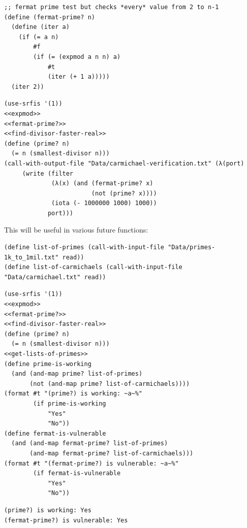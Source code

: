 \documentclass[final,fleqn,titlepage]{article}
\begin{document}
\begin{verbatim}
;; fermat prime test but checks *every* value from 2 to n-1
(define (fermat-prime? n)
  (define (iter a)
    (if (= a n)
        #f
        (if (= (expmod a n n) a)
            #t
            (iter (+ 1 a)))))
  (iter 2))
\end{verbatim}

\begin{verbatim}
(use-srfis '(1))
<<expmod>>
<<fermat-prime?>>
<<find-divisor-faster-real>>
(define (prime? n)
  (= n (smallest-divisor n)))
(call-with-output-file "Data/carmichael-verification.txt" (λ(port)
     (write (filter
             (λ(x) (and (fermat-prime? x)
                        (not (prime? x))))
             (iota (- 1000000 1000) 1000))
            port)))
\end{verbatim}

This will be useful in various future functions:
\begin{verbatim}
(define list-of-primes (call-with-input-file "Data/primes-1k_to_1mil.txt" read))
(define list-of-carmichaels (call-with-input-file "Data/carmichael.txt" read))
\end{verbatim}

\begin{verbatim}
(use-srfis '(1))
<<expmod>>
<<fermat-prime?>>
<<find-divisor-faster-real>>
(define (prime? n)
  (= n (smallest-divisor n)))
<<get-lists-of-primes>>
(define prime-is-working
  (and (and-map prime? list-of-primes)
       (not (and-map prime? list-of-carmichaels))))
(format #t "(prime?) is working: ~a~%"
        (if prime-is-working
            "Yes"
            "No"))
(define fermat-is-vulnerable
  (and (and-map fermat-prime? list-of-primes)
       (and-map fermat-prime? list-of-carmichaels)))
(format #t "(fermat-prime?) is vulnerable: ~a~%"
        (if fermat-is-vulnerable
            "Yes"
            "No"))
\end{verbatim}

\begin{verbatim}
(prime?) is working: Yes
(fermat-prime?) is vulnerable: Yes
\end{verbatim}
\end{document}
